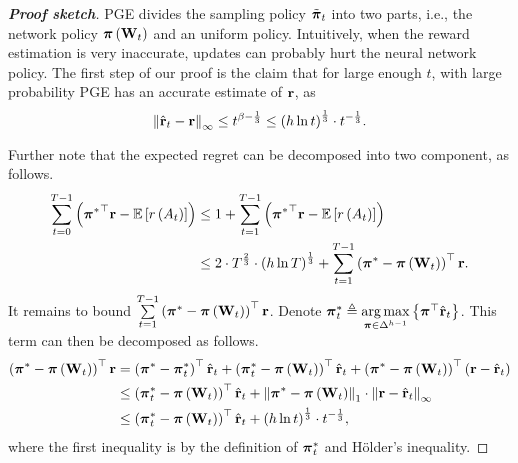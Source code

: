 \begin{proof}[\bf Proof sketch]
PGE divides the sampling policy $\tilde{{\boldsymbol{\pi}}}_t$ into two parts, i.e., the network policy ${\boldsymbol{\pi}}\left( {\mathbf{W}}_t \right)$ and an uniform policy. Intuitively, when the reward estimation is very inaccurate, updates can probably hurt the neural network policy.  
The first step of our proof is the claim that for large enough $t$, with large probability PGE has an accurate estimate of ${\mathbf{r}}$, as
\[
\left\| \hat{{\mathbf{r}}}_t - {\mathbf{r}} \right\|_\infty \le t^{\beta - \frac{1}{3}} \le \left( h \ln{t} \right) ^\frac{1}{3} \cdot t^{- \frac{1}{3}}.
\]
	
Further note that the expected regret can be decomposed into two component, as follows.
 \begin{equation}
 \label{eq:total_regret_decomposition}
 \begin{split}
 \sum\limits_{t=0}^{T-1}{ \left( {{\boldsymbol{\pi}}^*}^\top {\mathbf{r}} - {\mathbb{E}} \left[ r\left(A_t\right) \right] \right) } & \le 1 + \sum\limits_{t=1}^{T-1}{ \left( {{\boldsymbol{\pi}}^*}^\top {\mathbf{r}} - {\mathbb{E}} \left[ r\left(A_t\right) \right] \right) }\\
 &\le 2 \cdot T^{\frac{2}{3}} \cdot \left( h \ln{T} \right)^{\frac{1}{3}} + \sum\limits_{t=1}^{T-1}{ \left( {{\boldsymbol{\pi}}^*} - {\boldsymbol{\pi}}\left( {\mathbf{W}}_t \right) \right)^\top {\mathbf{r}} }.
 \end{split}
 \end{equation}
It remains to bound $ \sum\limits_{t=1}^{T-1}{ \left( {{\boldsymbol{\pi}}^*} - {\boldsymbol{\pi}}\left( {\mathbf{W}}_t \right) \right)^\top {\mathbf{r}} }$. 
Denote ${\boldsymbol{\pi}}_t^* \triangleq \operatorname*{arg\,max}\limits_{{\boldsymbol{\pi}} \in \Delta^{h-1}}{\left\{ {\boldsymbol{\pi}}^\top \hat{{\mathbf{r}}}_t\right\}}$. This term can then be decomposed as follows.
\begin{equation}
\label{eq:playing_learning_phase_regret_decomposition}
\begin{split}
\left( {{\boldsymbol{\pi}}^*} - {\boldsymbol{\pi}}\left( {\mathbf{W}}_t \right) \right)^\top {\mathbf{r}} &= \left( {{\boldsymbol{\pi}}^*} - {{\boldsymbol{\pi}}_t^*} \right)^\top \hat{{\mathbf{r}}}_t + \left( {{\boldsymbol{\pi}}_t^*} - {\boldsymbol{\pi}}\left( {\mathbf{W}}_t \right) \right)^\top \hat{{\mathbf{r}}}_t + \left( {{\boldsymbol{\pi}}^*} - {\boldsymbol{\pi}}\left( {\mathbf{W}}_t \right) \right)^\top \left( {\mathbf{r}} - \hat{{\mathbf{r}}}_t \right) \\
&\le \left( {{\boldsymbol{\pi}}_t^*} - {\boldsymbol{\pi}}\left( {\mathbf{W}}_t \right) \right)^\top \hat{{\mathbf{r}}}_t  + \left\| {\boldsymbol{\pi}}^* - {\boldsymbol{\pi}}\left( {\mathbf{W}}_t \right) \right\|_1 \cdot \left\| {\mathbf{r}} - \hat{{\mathbf{r}}}_t \right\|_\infty \\
&\le \left( {{\boldsymbol{\pi}}_t^*} - {\boldsymbol{\pi}}\left( {\mathbf{W}}_t \right) \right)^\top \hat{{\mathbf{r}}}_t + \left( h \ln{t} \right)^\frac{1}{3}  \cdot t^{- \frac{1}{3}},
\end{split}
\end{equation}
where the first inequality is by the definition of ${\boldsymbol{\pi}}_t^*$ and  H{\"o}lder's inequality. 


\end{proof}
